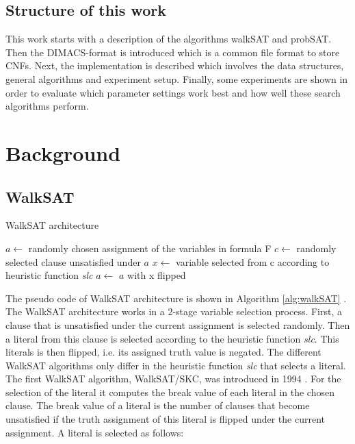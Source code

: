 \documentclass[12pt,a4paper]{article}
\begin{document}
\subsection{Structure of this work}
This work starts with a description of the algorithms walkSAT and probSAT. Then the DIMACS-format is introduced which is a common file format to store CNFs. Next, the implementation is described which involves the data structures, general algorithms and experiment setup. Finally, some experiments are shown in order to evaluate which parameter settings work best and how well these search algorithms perform.
\section{Background} \label{s:background}
\subsection{WalkSAT} \label{s:walkSAT}
\begin{algorithm}
  \caption{WalkSAT architecture}
    \label{alg:walkSAT}

  \begin{algorithmic}[1]
      \State $a \leftarrow$ randomly chosen assignment of the variables in formula F
          \State {}
        \EndIf
        \State $c \leftarrow$ randomly selected clause unsatisfied under $a$
        \State $x \leftarrow$ variable selected from c according to heuristic function \textit{slc}
        \State $a \leftarrow$ $a$ with x flipped
      \EndFor
    \EndFor
    
    \State {}
    \EndProcedure
  \end{algorithmic}
\end{algorithm}
The pseudo code of WalkSAT architecture is shown in Algorithm \ref{alg:walkSAT} \cite{SLS}. The WalkSAT architecture works in a 2-stage variable selection process. First, a clause that is unsatisfied under the current assignment is selected randomly. Then a literal from this clause is selected according to the heuristic function \textit{slc}. This literals is then flipped, i.e. its assigned truth value is negated. The different WalkSAT algorithms only differ in the heuristic function \textit{slc} that selects a literal. The first WalkSAT algorithm, WalkSAT/SKC, was introduced in 1994 \cite{Selman}. For the selection of the literal it computes the break value of each literal in the chosen clause. The break value of a literal is the number of clauses that become unsatisfied if the truth assignment of this literal is flipped under the current assignment. A literal is selected as follows:\\
\end{document}
